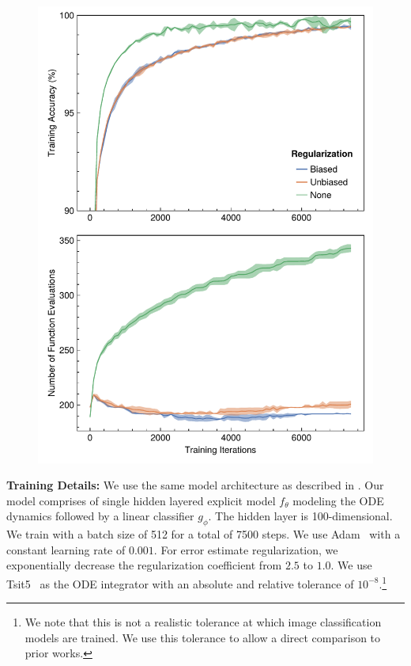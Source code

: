 \begin{figure}
  \centering
  \includegraphics[width=\linewidth]{../figures/local_regularizing_neural_des/mnist_ode.pdf}
  \label{fig:mnist_node_localreg}
\end{figure}

\textbf{Training Details:} We use the same model architecture as described in \citet{kelly2020learning}. Our model comprises of single hidden layered explicit model $f_\theta$ modeling the ODE dynamics followed by a linear classifier $g_\phi$.
The hidden layer is 100-dimensional. We train with a batch size of 512 for a total of 7500 steps. We use Adam~\citep{kingma2017adam} with a constant learning rate of $0.001$. For error estimate regularization, we exponentially decrease the regularization coefficient from $2.5$ to $1.0$. We use Tsit5~\citep{tsitouras2011runge} as the ODE integrator with an absolute and relative tolerance of $10^{-8}$.\footnote{We note that this is not a realistic tolerance at which image classification models are trained. We use this tolerance to allow a direct comparison to prior works.}

